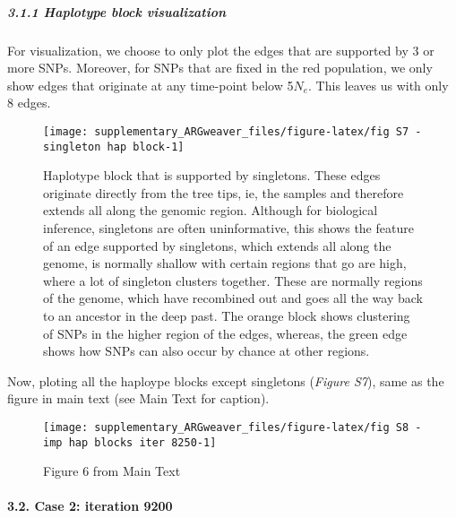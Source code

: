 \documentclass[
]{article}
\begin{document}
\hypertarget{haplotype-block-visualization}{%
\subparagraph{\texorpdfstring{3.1.1 Haplotype block visualization\\
}{3.1.1 Haplotype block visualization }}\label{haplotype-block-visualization}}

\hfill\break
For visualization, we choose to only plot the edges that are supported
by 3 or more SNPs. Moreover, for SNPs that are fixed in the red
population, we only show edges that originate at any time-point below
5\(N_e\). This leaves us with only 8 edges.

\begin{figure}

{\centering \texttt{[image: supplementary\_ARGweaver\_files/figure-latex/fig S7 - singleton hap block-1]} 

}

\caption{Haplotype block that is supported by singletons. These edges originate directly from the tree tips, ie, the samples and therefore extends all along the genomic region. Although for biological inference, singletons are often uninformative, this shows the feature of an edge supported by singletons, which extends all along the genome, is normally shallow with certain regions that go are high, where a lot of singleton clusters together. These are normally regions of the genome, which have recombined out and goes all the way back to an ancestor in the deep past. The orange block shows clustering of SNPs in the higher region of the edges, whereas, the green edge shows how SNPs can also occur by chance at other regions.}\label{fig:fig S7 - singleton hap block}
\end{figure}

Now, ploting all the haploype blocks except singletons (\emph{Figure
S7}), same as the figure in main text (see Main Text for caption).

\begin{figure}

{\centering \texttt{[image: supplementary\_ARGweaver\_files/figure-latex/fig S8 - imp hap blocks iter 8250-1]} 

}

\caption{Figure 6 from Main Text}\label{fig:fig S8 - imp hap blocks iter 8250}
\end{figure}

\hypertarget{case-2-iteration-9200}{%
\paragraph{\texorpdfstring{3.2. Case 2: iteration 9200\\
}{3.2. Case 2: iteration 9200 }}\label{case-2-iteration-9200}}
\end{document}
